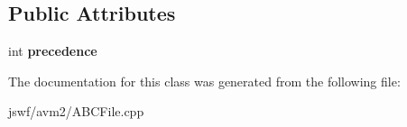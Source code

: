 \subsection*{Public Attributes}
\begin{DoxyCompactItemize}
\item 
\hypertarget{classjswf_1_1avm2_1_1_node_a35bf0cacc0414b547d6ed8458e5fe6dd}{int {\bfseries precedence}}\label{classjswf_1_1avm2_1_1_node_a35bf0cacc0414b547d6ed8458e5fe6dd}

\end{DoxyCompactItemize}


The documentation for this class was generated from the following file\+:\begin{DoxyCompactItemize}
\item 
jswf/avm2/A\+B\+C\+File.\+cpp\end{DoxyCompactItemize}
